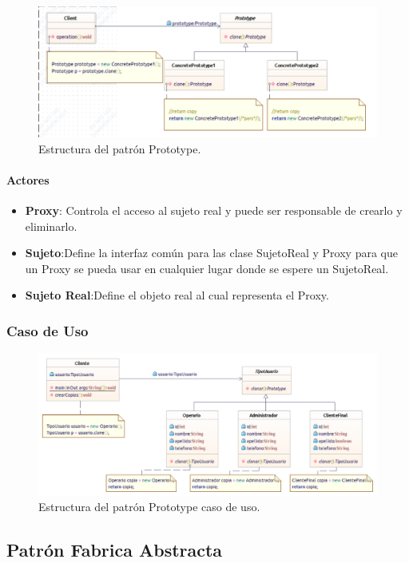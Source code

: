 \begin{figure}[th!]
	\centering
	\includegraphics[width=.7\linewidth]{imagenes/Patrones/Prototype.pdf}
	\caption{Estructura del patrón Prototype.\cite{gof}}	
\end{figure}

\paragraph{Actores}

\begin{itemize}
	\item \textbf{Proxy}: Controla el acceso al sujeto real y puede ser responsable de crearlo y eliminarlo.
	\item \textbf{Sujeto}:Define la interfaz común para las clase SujetoReal y Proxy para que un Proxy se pueda usar en cualquier lugar donde se espere un SujetoReal.
	\item \textbf{Sujeto Real}:Define el objeto real al cual representa el Proxy.
\end{itemize}


\subsubsection{Caso de Uso}

\begin{figure}[th!]
	\centering
	\includegraphics[width=.7\linewidth]{imagenes/Patrones/Prototype_caso.pdf}
	\caption{Estructura del patrón Prototype caso de uso.\cite{gof}}	
\end{figure}



\subsection{Patrón Fabrica Abstracta}
